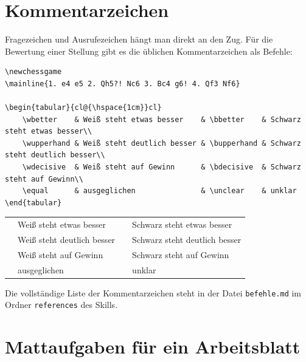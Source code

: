 \section{Kommentarzeichen}

Fragezeichen und Ausrufezeichen hängt man direkt an den Zug. Für die Bewertung einer Stellung gibt es die üblichen Kommentarzeichen als Befehle:

\begin{lstlisting}[style=latex]
\newchessgame
\mainline{1. e4 e5 2. Qh5?! Nc6 3. Bc4 g6! 4. Qf3 Nf6}

\begin{tabular}{cl@{\hspace{1cm}}cl}
	\wbetter    & Weiß steht etwas besser    & \bbetter    & Schwarz steht etwas besser\\
	\wupperhand & Weiß steht deutlich besser & \bupperhand & Schwarz steht deutlich besser\\
	\wdecisive  & Weiß steht auf Gewinn      & \bdecisive  & Schwarz steht auf Gewinn\\
	\equal      & ausgeglichen               & \unclear    & unklar
\end{tabular}
\end{lstlisting}

\begin{ausgabe}
	\newchessgame

	\begin{tabular}{cl@{\hspace{1cm}}cl}
		\wbetter    & Weiß steht etwas besser    & \bbetter    & Schwarz steht etwas besser\\
		\wupperhand & Weiß steht deutlich besser & \bupperhand & Schwarz steht deutlich besser\\
		\wdecisive  & Weiß steht auf Gewinn      & \bdecisive  & Schwarz steht auf Gewinn\\
		\equal      & ausgeglichen               & \unclear    & unklar
	\end{tabular}
\end{ausgabe}

Die vollständige Liste der Kommentarzeichen steht in der Datei \texttt{befehle.md} im Ordner \texttt{references} des Skills.



\section{Mattaufgaben für ein Arbeitsblatt}


